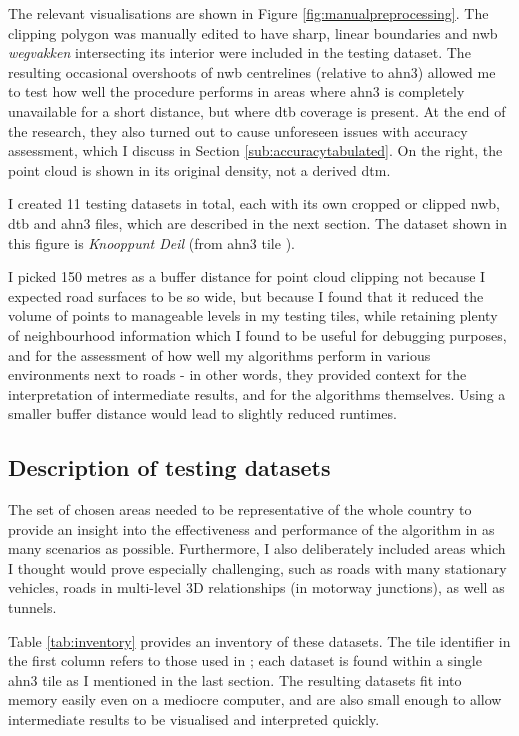 The relevant visualisations are shown in Figure \ref{fig:manualpreprocessing}. The clipping polygon was manually edited to have sharp, linear boundaries and \ac{nwb} \textit{wegvakken} intersecting its interior were included in the testing dataset. The resulting occasional overshoots of \ac{nwb} centrelines (relative to \ac{ahn3}) allowed me to test how well the procedure performs in areas where \ac{ahn3} is completely unavailable for a short distance, but where \ac{dtb} coverage is present. At the end of the research, they also turned out to cause unforeseen issues with accuracy assessment, which I discuss in Section \ref{sub:accuracytabulated}. On the right, the point cloud is shown in its original density, not a derived \ac{dtm}.

I created 11 testing datasets in total, each with its own cropped or clipped \ac{nwb}, \ac{dtb} and \ac{ahn3} files, which are described in the next section. The dataset shown in this figure is \textit{Knooppunt Deil} (from \ac{ahn3} tile ).

I picked 150 metres as a buffer distance for point cloud clipping not because I expected road surfaces to be so wide, but because I found that it reduced the volume of points to manageable levels in my testing tiles, while retaining plenty of neighbourhood information which I found to be useful for debugging purposes, and for the assessment of how well my algorithms perform in various environments next to roads - in other words, they provided context for the interpretation of intermediate results, and for the algorithms themselves. Using a smaller buffer distance would lead to slightly reduced runtimes.

\subsection{Description of testing datasets}
\label{sub:testingdata}

The set of chosen areas needed to be representative of the whole country to provide an insight into the effectiveness and performance of the algorithm in as many scenarios as possible. Furthermore, I also deliberately included areas which I thought would prove especially challenging, such as roads with many stationary vehicles, roads in multi-level 3D relationships (in motorway junctions), as well as tunnels.

Table \ref{tab:inventory} provides an inventory of these datasets. The tile identifier in the first column refers to those used in \cite{ahn3_download}; each dataset is found within a single \ac{ahn3} tile as I mentioned in the last section. The resulting datasets fit into memory easily even on a mediocre computer, and are also small enough to allow intermediate results to be visualised and interpreted quickly.

